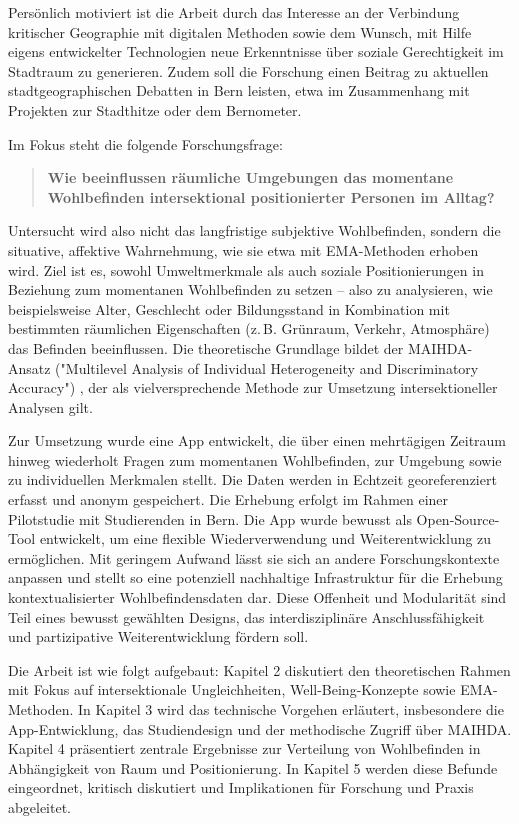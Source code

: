 Persönlich motiviert ist die Arbeit durch das Interesse an der Verbindung kritischer Geographie mit digitalen Methoden sowie dem Wunsch, mit Hilfe eigens entwickelter Technologien neue Erkenntnisse über soziale Gerechtigkeit im Stadtraum zu generieren. Zudem soll die Forschung einen Beitrag zu aktuellen stadtgeographischen Debatten in Bern leisten, etwa im Zusammenhang mit Projekten zur Stadthitze \parencite{burgerModellingSpatialPattern2021} oder dem Bernometer.

Im Fokus steht die folgende Forschungsfrage:

\begin{quote}
\textbf{Wie beeinflussen räumliche Umgebungen das momentane Wohlbefinden intersektional positionierter Personen im Alltag?}
\end{quote}

Untersucht wird also nicht das langfristige subjektive Wohlbefinden, sondern die situative, affektive Wahrnehmung, wie sie etwa mit EMA-Methoden erhoben wird. Ziel ist es, sowohl Umweltmerkmale als auch soziale Positionierungen in Beziehung zum momentanen Wohlbefinden zu setzen – also zu analysieren, wie beispielsweise Alter, Geschlecht oder Bildungsstand in Kombination mit bestimmten räumlichen Eigenschaften (z.\,B. Grünraum, Verkehr, Atmosphäre) das Befinden beeinflussen. Die theoretische Grundlage bildet der MAIHDA-Ansatz ("Multilevel Analysis of Individual Heterogeneity and Discriminatory Accuracy") \parencite{grossModellingIntersectionalityQuantitative2023}, der als vielversprechende Methode zur Umsetzung intersektioneller Analysen gilt.

Zur Umsetzung wurde eine App entwickelt, die über einen mehrtägigen Zeitraum hinweg wiederholt Fragen zum momentanen Wohlbefinden, zur Umgebung sowie zu individuellen Merkmalen stellt. Die Daten werden in Echtzeit georeferenziert erfasst und anonym gespeichert. Die Erhebung erfolgt im Rahmen einer Pilotstudie mit Studierenden in Bern. Die App wurde bewusst als Open-Source-Tool entwickelt, um eine flexible Wiederverwendung und Weiterentwicklung zu ermöglichen. Mit geringem Aufwand lässt sie sich an andere Forschungskontexte anpassen und stellt so eine potenziell nachhaltige Infrastruktur für die Erhebung kontextualisierter Wohlbefindensdaten dar. Diese Offenheit und Modularität sind Teil eines bewusst gewählten Designs, das interdisziplinäre Anschlussfähigkeit und partizipative Weiterentwicklung fördern soll.

Die Arbeit ist wie folgt aufgebaut: Kapitel 2 diskutiert den theoretischen Rahmen mit Fokus auf intersektionale Ungleichheiten, Well-Being-Konzepte sowie EMA-Methoden. In Kapitel 3 wird das technische Vorgehen erläutert, insbesondere die App-Entwicklung, das Studiendesign und der methodische Zugriff über MAIHDA. Kapitel 4 präsentiert zentrale Ergebnisse zur Verteilung von Wohlbefinden in Abhängigkeit von Raum und Positionierung. In Kapitel 5 werden diese Befunde eingeordnet, kritisch diskutiert und Implikationen für Forschung und Praxis abgeleitet.

